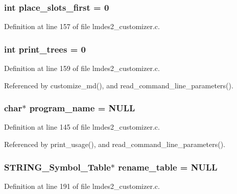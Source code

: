 \subsubsection{\setlength{\rightskip}{0pt plus 5cm}int \bf{place\_\-slots\_\-first} = 0}\label{lmdes2__customizer_8c_b5d3cfa3af0f0d0f3aae26ebc6253224}




Definition at line 157 of file lmdes2\_\-customizer.c.
\subsubsection{\setlength{\rightskip}{0pt plus 5cm}int \bf{print\_\-trees} = 0}\label{lmdes2__customizer_8c_34ea62a4bb6a61dc0899f0f65c9b8f46}




Definition at line 159 of file lmdes2\_\-customizer.c.

Referenced by customize\_\-md(), and read\_\-command\_\-line\_\-parameters().
\subsubsection{\setlength{\rightskip}{0pt plus 5cm}char$\ast$ \bf{program\_\-name} = \bf{NULL}}\label{lmdes2__customizer_8c_289c5900d90626d909f0a85d5a0ed61d}




Definition at line 145 of file lmdes2\_\-customizer.c.

Referenced by print\_\-usage(), and read\_\-command\_\-line\_\-parameters().
\subsubsection{\setlength{\rightskip}{0pt plus 5cm}\bf{STRING\_\-Symbol\_\-Table}$\ast$ \bf{rename\_\-table} = \bf{NULL}}\label{lmdes2__customizer_8c_b4ce2bf45b0a0cbca226867bcee5970f}




Definition at line 191 of file lmdes2\_\-customizer.c.

